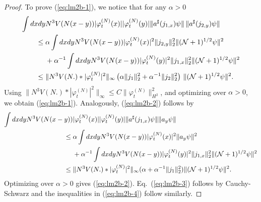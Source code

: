 \documentclass[11pt,a4paper]{article}
\newcommand{\cN}{{\cal N}}
\begin{document}
\begin{proof}
To prove (\ref{eq:lm2b-1}), we notice that for any $\alpha > 0$
\[ \begin{split} 
\int dx dy &N^3 V(N (x-y)) |\varphi_t^{(N)} (x)| |\varphi_t^{(N)} (y)|  \| a^\sharp (j_{1,x}) \psi \| \, \| a^\sharp (j_{2,y}) \psi \| \\ \leq \; & \alpha \int dx dy N^3 V(N (x-y)) |\varphi^{(N)}_t (x)|^2 \| j_{2,y} \|_2^2 \| (\cN+1)^{1/2} \psi \|^2 \\ &+ \alpha^{-1}
 \int dx dy N^3 V(N (x-y)) |\varphi^{(N)}_t (y)|^2 \| j_{1,x} \|_2^2 \| (\cN+1)^{1/2} \psi \|^2 \\
 \leq \; & \| N^3 V(N.) * |\varphi_t^{(N)}|^2 \|_\infty  \left( \alpha \| j_{1} \|^2_2 + \alpha^{-1}
 \| j_2 \|_{2}^2 \right) \, \| (\cN+1)^{1/2} \psi \|^2.
 \end{split} \]
 Using $\| N^3 V(N.) * |\varphi_t^{(N)}|^2 \|_\infty \leq C \| \varphi_t^{(N)} \|_{H^2}^2$, and optimizing over $\alpha >0$, we obtain (\ref{eq:lm2b-1}). Analogously, (\ref{eq:lm2b-2}) follows by
\[ \begin{split} 
\int dx dy N^3 V(N (x-y)) &|\varphi^{(N)}_t (x)| |\varphi^{(N)}_t (y)| \| a^\sharp (j_{1,x}) \psi \| \| a_y \psi \| \\ 
\leq \; & \alpha \int dx dy N^3 V(N (x-y)) |\varphi^{(N)}_t (x)|^2 \| a_y \psi \|^2  \\ &+ \alpha^{-1}
 \int dx dy N^3 V(N (x-y)) |\varphi^{(N)}_t (y)|^2 \| j_{1,x} \|_2^2 \| (\cN+1)^{1/2} \psi \|^2 \\
 \leq \; & \| N^3 V(N.) * |\varphi_t^{(N)}|^2 \|_\infty (\alpha + \alpha^{-1} \| j_1\|_{2}^2) \| (\cN+1)^{1/2} \psi \|^2.
 \end{split} \]
 Optimizing over $\alpha >0$ gives (\ref{eq:lm2b-2}). Eq.\ (\ref{eq:lm2b-3}) follows by Cauchy-Schwarz and the inequalities in (\ref{eq:lm2b-4}) follow similarly.

\end{proof}
\end{document}
